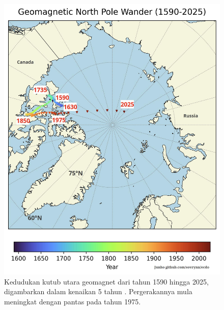 \documentclass[10pt,twocolumn,letterpaper]{article}
\begin{document}
\begin{figure}[t]
\begin{center}
   \includegraphics[width=1\linewidth]{npw.jpg}
\end{center}
   \caption{Kedudukan kutub utara geomagnet dari tahun 1590 hingga 2025, digambarkan dalam kenaikan 5 tahun \cite{41}. Pergerakannya mula meningkat dengan pantas pada tahun 1975.}
\label{fig:13}
\label{fig:onecol}
\end{figure}
\end{document}
